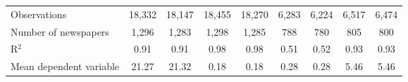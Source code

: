 {\begin{tabular}{l*{8}{c}}
\midrule
Observations        &      18,332         &      18,147         &      18,455         &      18,270         &       6,283         &       6,224         &       6,517         &       6,474         \\
Number of newspapers&       1,296         &       1,283         &       1,298         &       1,285         &         788         &         780         &         805         &         800         \\
R$^2$               &        0.91         &        0.91         &        0.98         &        0.98         &        0.51         &        0.52         &        0.93         &        0.93         \\
Mean dependent variable&       21.27         &       21.32         &        0.18         &        0.18         &        0.28         &        0.28         &        5.46         &        5.46         \\
\bottomrule
\end{tabular}
}
